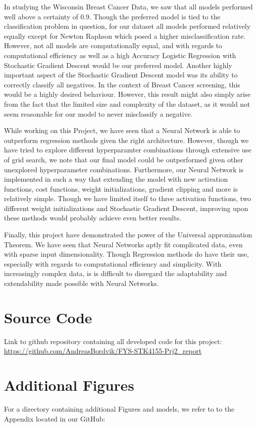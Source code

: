 \documentclass
[twocolumn,
secnumarabic,
nobibnotes,
aps,
prl,
reprint,
groupedaddress,
amsmath,
amssymb
]{revtex4-2}
\begin{document}
In studying the Wisconsin Breast Cancer Data, we saw that all models performed well above a certainty of $0.9$. Though the preferred model is tied to the classification problem in question, for our dataset all models performed relatively equally except for Newton Raphson which posed a higher misclassification rate. However, not all models are computationally equal, and with regards to computational efficiency as well as a high Accuracy Logistic Regression with Stochastic Gradient Descent would be our preferred model. Another highly important aspect of the Stochastic Gradient Descent model was its ability to correctly classify all negatives. In the context of Breast Cancer screening, this would be a highly desired behaviour. However, this result might also simply arise from the fact that the limited size and complexity of the dataset, as it would not seem reasonable for our model to never misclassify a negative. 

While working on this Project, we have seen that a Neural Network is able to outperform regression methods given the right architecture. However, though we have tried to explore different hyperparamter combinations through extensive use of grid search, we note that our final model could be outperformed given other unexplored hyperparameter combinations. Furthermore, our Neural Network is implemented in such a way that extending the model with new activation functions, cost functions, weight initializations, gradient clipping and more is relatively simple. Though we have limited itself to three activation functions, two different weight initializations and Stochastic Gradient Descent, improving upon these methods would probably achieve even better results.

Finally, this project have demonstrated the power of the Universal approximation Theorem. We have seen that Neural Networks aptly fit complicated data, even with sparse input dimensionality. Though Regression methods do have their use, especially with regards to computational efficiency and simplicity. With increasingly complex data, is is difficult to disregard the adaptability and extendability made possible with Neural Networks.  

\appendix

\section{Source Code}
\label{sec:sc}
Link to github repository containing all developed code for this project: \url{https://github.com/AndreasBordvik/FYS-STK4155-Prj2_report}

\section{Additional Figures}
For a directory containing additional Figures and models, we refer to to the Appendix located in our GitHub: \url{}





\end{document}
